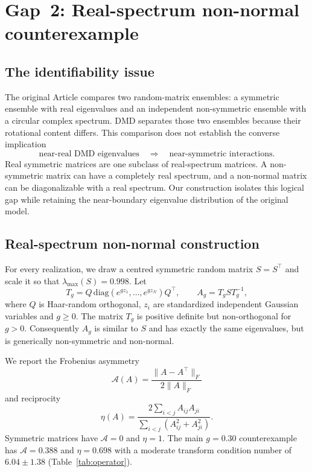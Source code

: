 \documentclass[11pt]{article}
\newcommand{\asym}{\mathcal{A}}
\begin{document}
\section{Gap~2: Real-spectrum non-normal counterexample}
\label{sec:counterexample}

\subsection{The identifiability issue}
The original Article compares two random-matrix ensembles: a symmetric ensemble
with real eigenvalues and an independent non-symmetric ensemble with a circular
complex spectrum. DMD separates those two ensembles because their rotational
content differs. This comparison does not establish the converse implication
\[
  \text{near-real DMD eigenvalues}\quad\Longrightarrow\quad
  \text{near-symmetric interactions}.
\]
Real symmetric matrices are one subclass of real-spectrum matrices. A
non-symmetric matrix can have a completely real spectrum, and a non-normal
matrix can be diagonalizable with a real spectrum. Our construction isolates
this logical gap while retaining the near-boundary eigenvalue distribution of
the original model.

\subsection{Real-spectrum non-normal construction}
For every realization, we draw a centred symmetric random matrix $S=S^\top$
and scale it so that $\lambda_{\max}(S)=0.998$. Let
\begin{equation}
  T_g=Q\,\mathrm{diag}(e^{g z_1},\ldots,e^{g z_N})Q^\top,
  \qquad A_g=T_g S T_g^{-1},
  \label{eq:construction}
\end{equation}
where $Q$ is Haar-random orthogonal, $z_i$ are standardized independent
Gaussian variables and $g\geq0$. The matrix $T_g$ is positive definite but
non-orthogonal for $g>0$. Consequently $A_g$ is similar to $S$ and has exactly
the same eigenvalues, but is generically non-symmetric and non-normal.

We report the Frobenius asymmetry
\begin{equation}
  \asym(A)=\frac{\lVert A-A^\top\rVert_F}{2\lVert A\rVert_F}
\end{equation}
and reciprocity
\begin{equation}
  \eta(A)=
  \frac{2\sum_{i<j}A_{ij}A_{ji}}
       {\sum_{i<j}(A_{ij}^2+A_{ji}^2)}.
\end{equation}
Symmetric matrices have $\asym=0$ and $\eta=1$. The main $g=0.30$
counterexample has $\asym=0.388$ and $\eta=0.698$ with a moderate transform
condition number of $6.04\pm1.38$ (Table~\ref{tab:operator}).
\end{document}
